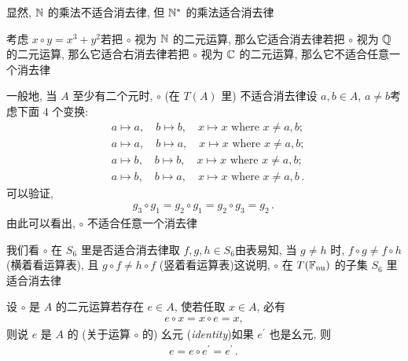 \begin{example}
    显然, $\mathbb{N}$ 的乘法不适合消去律, 但 $\mathbb{N}^{\ast}$ 的乘法适合消去律\period
\end{example}

\begin{example}
    考虑 $x \circ y = x^3 + y^2$\period 若把 $\circ$ 视为 $\mathbb{N}$ 的二元运算, 那么它适合消去律\period 若把 $\circ$ 视为 $\mathbb{Q}$ 的二元运算, 那么它适合右消去律\period 若把 $\circ$ 视为 $\mathbb{C}$ 的二元运算, 那么它不适合任意一个消去律\period
\end{example}

\begin{example}
    一般地, 当 $A$ 至少有二个元时, $\circ$ (在 $T(A)$ 里) 不适合消去律\period 设 $a,b \in A$, $a \neq b$\period 考虑下面 $4$ 个变换:
    \begin{align*}
         & a \mapsto a, \quad b \mapsto b, \quad x \mapsto x \text{ where $x \neq a,b$}; \tag*{$g_0 \colon$}       \\
         & a \mapsto a, \quad b \mapsto a, \quad x \mapsto x \text{ where $x \neq a,b$}; \tag*{$g_1 \colon$}       \\
         & a \mapsto b, \quad b \mapsto b, \quad x \mapsto x \text{ where $x \neq a,b$}; \tag*{$g_2 \colon$}       \\
         & a \mapsto b, \quad b \mapsto a, \quad x \mapsto x \text{ where $x \neq a,b$}\period \tag*{$g_3 \colon$}
    \end{align*}
    可以验证,
    \begin{align*}
        g_3 \circ g_1 = g_2 \circ g_1 = g_2 \circ g_3 = g_2 \period
    \end{align*}
    由此可以看出, $\circ$ 不适合任意一个消去律\period
\end{example}

\begin{example}
    我们看 $\circ$ 在 $S_6$ 里是否适合消去律\period 取 $f,g,h \in S_6$\period 由表易知, 当 $g \neq h$ 时, $f \circ g \neq f \circ h$ (横着看运算表), 且 $g \circ f \neq h \circ f$ (竖着看运算表)\period 这说明, $\circ$ 在 $T(\mathbb{F}_{\mathrm{nu}})$ 的子集 $S_6$ 里适合消去律\period
\end{example}

\begin{definition}
    设 $\circ$ 是 $A$ 的二元运算\period 若存在 $e \in A$, 使若任取 $x \in A$, 必有
    \begin{align*}
        e \circ x = x \circ e = x,
    \end{align*}
    则说 $e$ 是 $A$ 的 (关于运算 $\circ$ 的) 幺元 (\textit{identity})\period 如果 $e^{\prime}$ 也是幺元, 则
    \begin{align*}
        e = e \circ e^{\prime} = e^{\prime} \period
    \end{align*}
\end{definition}

